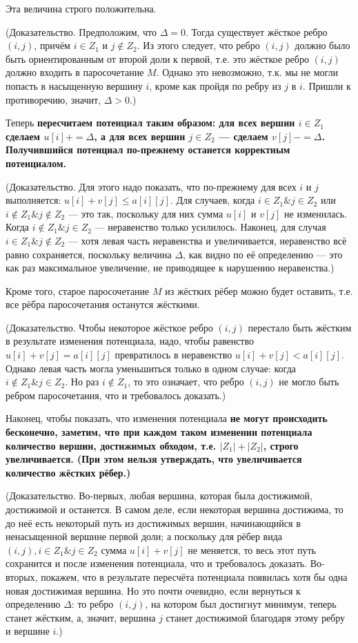 {Эта величина строго положительна.

(Доказательство. Предположим, что $\Delta = 0$. Тогда существует жёсткое ребро $(i,j)$, причём $i \in Z_1$ и $j \notin Z_2$. Из этого следует, что ребро $(i,j)$ должно было быть ориентированным от второй доли к первой, т.е. это жёсткое ребро $(i,j)$ должно входить в паросочетание $M$. Однако это невозможно, т.к. мы не могли попасть в насыщенную вершину $i$, кроме как пройдя по ребру из $j$ в $i$. Пришли к противоречию, значит, $\Delta > 0$.)

Теперь \bf{пересчитаем потенциал} таким образом: для всех вершин $i \in Z_1$ сделаем $u[i] += \Delta$, а для всех вершин $j \in Z_2$ --- сделаем $v[j] -= \Delta$. Получившийся потенциал по-прежнему останется корректным потенциалом.

(Доказательство. Для этого надо показать, что по-прежнему для всех $i$ и $j$ выполняется: $u[i] + v[j] \le a[i][j]$. Для случаев, когда $i \in Z_1 \& j \in Z_2$ или $i \notin Z_1 \& j \notin Z_2$ --- это так, поскольку для них сумма $u[i]$ и $v[j]$ не изменилась. Когда $i \notin Z_1 \& j \in Z_2$ --- неравенство только усилилось. Наконец, для случая $i \in Z_1 \& j \notin Z_2$ --- хотя левая часть неравенства и увеличивается, неравенство всё равно сохраняется, поскольку величина $\Delta$, как видно по её определению --- это как раз максимальное увеличение, не приводящее к нарушению неравенства.)

Кроме того, старое паросочетание $M$ из жёстких рёбер можно будет оставить, т.е. все рёбра паросочетания останутся жёсткими.

(Доказательство. Чтобы некоторое жёсткое ребро $(i,j)$ перестало быть жёстким в результате изменения потенциала, надо, чтобы равенство $u[i] + v[j] = a[i][j]$ превратилось в неравенство $u[i] + v[j] < a[i][j]$. Однако левая часть могла уменьшиться только в одном случае: когда $i \notin Z_1 \& j \in Z_2$. Но раз $i \notin Z_1$, то это означает, что ребро $(i,j)$ не могло быть ребром паросочетания, что и требовалось доказать.)

Наконец, чтобы показать, что изменения потенциала \bf{не могут происходить бесконечно}, заметим, что при каждом таком изменении потенциала количество вершин, достижимых обходом, т.е. $|Z_1|+|Z_2|$, строго увеличивается. (При этом нельзя утверждать, что увеличивается количество жёстких рёбер.)

(Доказательство. Во-первых, любая вершина, которая была достижимой, достижимой и останется. В самом деле, если некоторая вершина достижима, то до неё есть некоторый путь из достижимых вершин, начинающийся в ненасыщенной вершине первой доли; а поскольку для рёбер вида $(i,j), i \in Z_1 \& j \in Z_2$ сумма $u[i] + v[j]$ не меняется, то весь этот путь сохранится и после изменения потенциала, что и требовалось доказать. Во-вторых, покажем, что в результате пересчёта потенциала появилась хотя бы одна новая достижимая вершина. Но это почти очевидно, если вернуться к определению $\Delta$: то ребро $(i,j)$, на котором был достигнут минимум, теперь станет жёстким, а, значит, вершина $j$ станет достижимой благодаря этому ребру и вершине $i$.)

}
